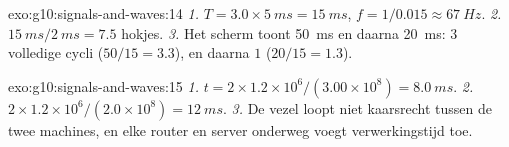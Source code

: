 \begin{solution}{exo:g10:signals-and-waves:14}
\emph{1.} $T = 3.0 \times \qty{5}{ms} = \qty{15}{ms}$,
$f = 1/0.015 \approx \qty{67}{Hz}$.
\emph{2.} $\qty{15}{ms}/\qty{2}{ms} = 7.5$ hokjes.
\emph{3.} Het scherm toont \qty{50}{ms} en daarna \qty{20}{ms}: $3$
volledige cycli ($50/15 = 3.3$), en daarna $1$ ($20/15 = 1.3$).
\end{solution}

\begin{solution}{exo:g10:signals-and-waves:15}
\emph{1.} $t = 2 \times 1.2\times10^{6}/(3.00\times10^{8}) =
\qty{8.0}{ms}$.
\emph{2.} $2 \times 1.2\times10^{6}/(2.0\times10^{8}) = \qty{12}{ms}$.
\emph{3.} De vezel loopt niet kaarsrecht tussen de twee machines, en
elke router en server onderweg voegt verwerkingstijd toe.
\end{solution}

